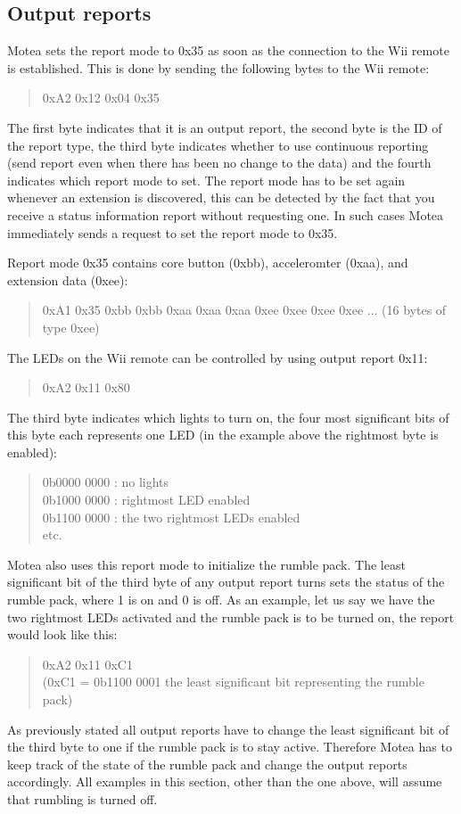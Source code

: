 \subsection{Output reports}
Motea sets the report mode to 0x35 as soon as the connection to the Wii remote is established. This is done by sending the following bytes to the Wii remote:
\begin{quote}
0xA2 0x12 0x04 0x35
\end{quote}
The first byte indicates that it is an output report, the second byte is the ID of the report type, the third byte indicates whether to use continuous reporting (send report even when there has been no change to the data) and the fourth indicates which report mode to set. The report mode has to be set again whenever an extension is discovered, this can be detected by the fact that you receive a status information report without requesting one. In such cases Motea immediately sends a request to set the report mode to 0x35.

Report mode 0x35 contains core button (0xbb), acceleromter (0xaa), and extension data (0xee):
\begin{quote}
0xA1 0x35 0xbb 0xbb 0xaa 0xaa 0xaa 0xee 0xee 0xee 0xee ... (16 bytes of type 0xee)
\end{quote}

The LEDs on the Wii remote can be controlled by using output report 0x11:
\begin{quote}
0xA2 0x11 0x80
\end{quote}
The third byte indicates which lights to turn on, the four most significant bits of this byte each represents one LED (in the example above the rightmost byte is enabled):
\begin{quote}
0b0000 0000 : no lights\\
0b1000 0000 : rightmost LED enabled\\
0b1100 0000 : the two rightmost LEDs enabled\\
etc.
\end{quote}
Motea also uses this report mode to initialize the rumble pack. The least significant bit of the third byte of any output report turns sets the status of the rumble pack, where 1 is on and 0 is off. As an example, let us say we have the two rightmost LEDs activated and the rumble pack is to be turned on, the report would look like this:
\begin{quote}	
0xA2 0x11 0xC1\\
(0xC1 = 0b1100 0001 the least significant bit representing the rumble pack)
\end{quote}
As previously stated all output reports have to change the least significant bit of the third byte to one if the rumble pack is to stay active. Therefore Motea has to keep track of the state of the rumble pack and change the output reports accordingly. All examples in this section, other than the one above, will assume that rumbling is turned off.

